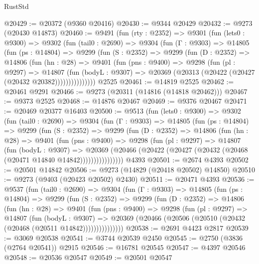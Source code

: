 \begin{lexlean}{RustStd}
\begin{coremodule}
@20429 := @20372 (@9360 @20416)
@20430 := @9344 @20429
@20432 := @9273 (@20430 @14873)
@20460 := @9491
    (fun (rty : @2352) =>
    @9301
      (fun (lets0 : @9300) =>
      @9302
        (fun (tail0 : @2690) =>
        @9304
          (fun (Γ : @9303) =>
          @14805
            (fun (ps : @14804) =>
            @9299
              (fun (S : @2352) =>
              @9299
                (fun (D : @2352) =>
                @14806
                  (fun (hn : @28) =>
                  @9401
                    (fun (pns : @9400) =>
                    @9298
                      (fun (pl : @9297) =>
                      @14807
                        (fun (bodyL : @9307) =>
                        @20369 (@20313 (@20422 (@20427 (@20432 @20382)))))))))))))))
    @2525
@20461 := @14819 @2525
@20462 := @20461 @9291
@20466 := @9273 (@20311 (@14816 (@14818 @20462)))
@20467 := @9373 @2525
@20468 := @14876 @20467
@20469 := @9376 @20467
@20471 := @20469 @20377 @16403
@20500 := @9513
    (fun (lets0 : @9300) =>
    @9302
      (fun (tail0 : @2690) =>
      @9304
        (fun (Γ : @9303) =>
        @14805
          (fun (ps : @14804) =>
          @9299
            (fun (S : @2352) =>
            @9299
              (fun (D : @2352) =>
              @14806
                (fun (hn : @28) =>
                @9401
                  (fun (pns : @9400) =>
                  @9298
                    (fun (pl : @9297) =>
                    @14807
                      (fun (bodyL : @9307) =>
                      @20369
                        (@20466
                          (@20422 (@20427 (@20432 (@20468 (@20471 @14840 @14842))))))))))))))))
    @4393
@20501 := @2674 @4393
@20502 := @20501 @14842
@20506 := @9273 (@14829 (@20418 @20502) @14850)
@20510 := @9273 (@9403 (@20423 @20502) @2430)
@20511 := @20471 @4393
@20536 := @9537
    (fun (tail0 : @2690) =>
    @9304
      (fun (Γ : @9303) =>
      @14805
        (fun (ps : @14804) =>
        @9299
          (fun (S : @2352) =>
          @9299
            (fun (D : @2352) =>
            @14806
              (fun (hn : @28) =>
              @9401
                (fun (pns : @9400) =>
                @9298
                  (fun (pl : @9297) =>
                  @14807
                    (fun (bodyL : @9307) =>
                    @20369 (@20466 (@20506 (@20510 (@20432 (@20468 (@20511 @14842)))))))))))))))
@20538 := @2691 @4423 @2817
@20539 := @3069 @20538
@20541 := @3744 @20539 @2450
@20545 := @2750 (@3836 (@2764 @20541)) @2915
@20546 := @16781 @20545
@20547 := @4397 @20546
@20548 := @20536 @20547
@20549 := @20501 @20547

\end{coremodule}
\end{lexlean}
